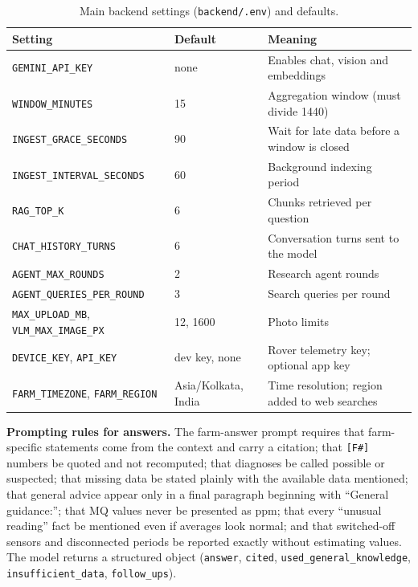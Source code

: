 \begin{table}[H]
\centering
\caption{Main backend settings (\texttt{backend/.env}) and defaults.}
\label{tab:settings}
\small
\begin{tabular}{|P{4.6cm}|P{2.6cm}|P{5.6cm}|}
\hline
\textbf{Setting} & \textbf{Default} & \textbf{Meaning}\\\hline
\texttt{GEMINI\_API\_KEY} & none & Enables chat, vision and embeddings\\\hline
\texttt{WINDOW\_MINUTES} & 15 & Aggregation window (must divide 1440)\\\hline
\texttt{INGEST\_GRACE\_SECONDS} & 90 & Wait for late data before a window is closed\\\hline
\texttt{INGEST\_INTERVAL\_SECONDS} & 60 & Background indexing period\\\hline
\texttt{RAG\_TOP\_K} & 6 & Chunks retrieved per question\\\hline
\texttt{CHAT\_HISTORY\_TURNS} & 6 & Conversation turns sent to the model\\\hline
\texttt{AGENT\_MAX\_ROUNDS} & 2 & Research agent rounds\\\hline
\texttt{AGENT\_QUERIES\_PER\_ROUND} & 3 & Search queries per round\\\hline
\texttt{MAX\_UPLOAD\_MB}, \texttt{VLM\_MAX\_IMAGE\_PX} & 12, 1600 & Photo limits\\\hline
\texttt{DEVICE\_KEY}, \texttt{API\_KEY} & dev key, none & Rover telemetry key; optional app key\\\hline
\texttt{FARM\_TIMEZONE}, \texttt{FARM\_REGION} & Asia/Kolkata, India & Time resolution; region added to web searches\\\hline
\end{tabular}
\end{table}

\noindent\textbf{Prompting rules for answers.} The farm-answer prompt requires that farm-specific statements come from the context and
carry a citation; that \texttt{[F\#]} numbers be quoted and not recomputed; that diagnoses be called possible or suspected; that missing
data be stated plainly with the available data mentioned; that general advice appear only in a final paragraph beginning with
``General guidance:''; that MQ values never be presented as ppm; that every ``unusual reading'' fact be mentioned even if averages look
normal; and that switched-off sensors and disconnected periods be reported exactly without estimating values. The model
returns a structured object (\texttt{answer}, \texttt{cited}, \texttt{used\_general\_knowledge}, \texttt{insufficient\_data},
\texttt{follow\_ups}).

